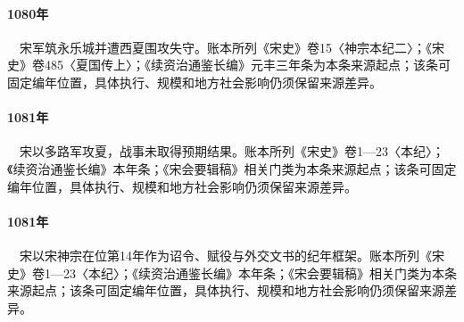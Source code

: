 \paragraph{1080年}　宋军筑永乐城并遭西夏围攻失守。账本所列《宋史》卷15〈神宗本纪二〉；《宋史》卷485〈夏国传上〉；《续资治通鉴长编》元丰三年条为本条来源起点；该条可固定编年位置，具体执行、规模和地方社会影响仍须保留来源差异。

\paragraph{1081年}　宋以多路军攻夏，战事未取得预期结果。账本所列《宋史》卷1—23〈本纪〉；《续资治通鉴长编》本年条；《宋会要辑稿》相关门类为本条来源起点；该条可固定编年位置，具体执行、规模和地方社会影响仍须保留来源差异。

\paragraph{1081年}　宋以宋神宗在位第14年作为诏令、赋役与外交文书的纪年框架。账本所列《宋史》卷1—23〈本纪〉；《续资治通鉴长编》本年条；《宋会要辑稿》相关门类为本条来源起点；该条可固定编年位置，具体执行、规模和地方社会影响仍须保留来源差异。
